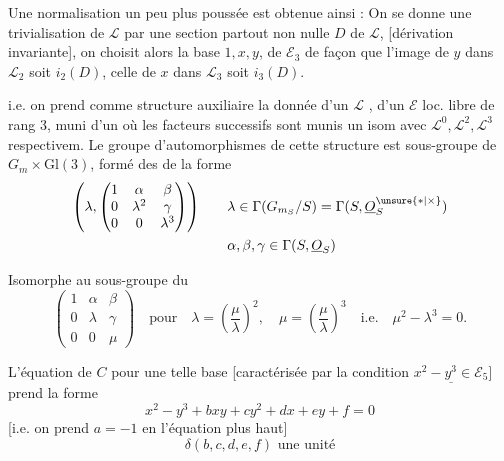 Une normalisation  un peu plus poussée est obtenue ainsi : On se donne une trivialisation de $\mathcal L$ par une section partout non nulle $D$ de $\mathcal L$, [dérivation invariante], on choisit alors la base $1,x,y$, de $\mathcal E_3$ de façon que l'image de $y$ dans $\mathcal L_2$ soit $i_2(D)$, celle de $x$ dans $\mathcal L_3$ soit $i_3(D)$. 

\deleted{$[$} i.e. on prend comme structure auxiliaire la donnée d'un $\mathcal L$ , d'un $\mathcal E$ loc. libre de rang 3, muni d'un  où les facteurs successifs sont munis un isom avec $\mathcal L^0,\mathcal L^2,\mathcal L^3$ respectivem. Le groupe d'automorphismes de cette structure est   sous-groupe de $G_m\times\mathrm{Gl}(3)$, formé des   de la forme
\[
\begin{aligned}
\left(\lambda,\begin{pmatrix}1&\alpha&\beta\\0&\lambda^2&\gamma\\0&0&\lambda^3\end{pmatrix}\right)
&\qquad \lambda\in\Gamma(G_{m_S}/S)=\Gamma(S,\underline O_S^{\unsure{*|\times}})\\
&\qquad \alpha,\beta,\gamma\in\Gamma(S,\underline O_S)
\end{aligned}
\]

 Isomorphe  au sous-groupe du  
\[
\begin{pmatrix}1&\alpha&\beta\\0&\lambda&\gamma\\0&0&\mu\end{pmatrix}
\quad\text{pour}\quad \lambda=\left(\frac{\mu}{\lambda}\right)^2,\quad \mu=\left(\frac{\mu}{\lambda}\right)^3
\quad\text{i.e.}\quad \boxed{\mu^2-\lambda^3=0}.
\]

L'équation de $C$ pour une telle base  [caractérisée par la condition $\underline{x^2-y^3\in\mathcal E_5}$] prend la forme
\[
x^2-y^3+bxy+cy^2+dx+ey+f=0
\]
[i.e. on prend $a=-1$ en l'équation plus haut]
\[
\boxed{\delta(b,c,d,e,f)\text{ une unité}}
\]
